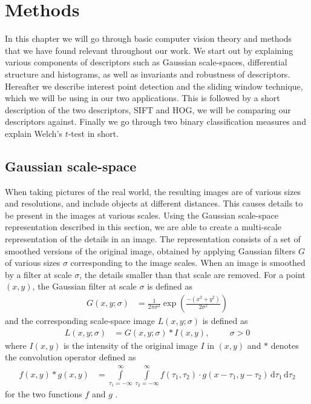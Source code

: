 \documentclass[thesis.tex]{subfiles}
\begin{document}
\chapter{Methods}
In this chapter we will go through basic computer vision theory and methods that we have found relevant throughout our work. We start out by explaining various components of descriptors such as Gaussian scale-spaces, differential structure and histograms, as well as invariants and robustness of descriptors. Hereafter we describe interest point detection and the sliding window technique, which we will be using in our two applications. This is followed by a short description of the two descriptors, SIFT and HOG, we will be comparing our descriptors against. Finally we go through two binary classification measures and explain Welch's $t$-test in short.

\section{Gaussian scale-space}
\label{sec:GaussianScaleSpace}
%
When taking pictures of the real world, the resulting images are of various sizes and resolutions, and include objects at different distances. This causes details to be present in the images at various scales. Using the Gaussian scale-space representation \cite{griffin1997scale,ginneken2000applications} described in this section, we are able to create a multi-scale representation of the details in an image. The representation consists of a set of smoothed versions of the original image, obtained by applying Gaussian filters $G$ of various sizes $\sigma$ corresponding to the image scales. When an image is smoothed by a filter at scale $\sigma$, the details smaller than that scale are removed. For a point $(x,y)$, the Gaussian filter at scale $\sigma$ is defined as
%
\begin{align}
	G(x,y;\sigma) &= \frac{1}{2\pi \sigma^2} \exp \left(\frac{-(x^2+y^2)}{2\sigma^2} \right)
\end{align}
%
and the corresponding scale-space image $L(x,y;\sigma)$ is defined as
%
\begin{align}
	L(x,y;\sigma) &= G(x,y;\sigma) \ast I(x,y),\hspace{1cm}\sigma > 0
\end{align}
%
where $I(x,y)$ is the intensity of the original image $I$ in $(x,y)$ and $\ast$ denotes the convolution operator defined as
\begin{align*}
	f(x,y) \ast g(x,y) &= \int\limits_{\tau_1 = -\infty}^\infty \int\limits_{\tau_2 = -\infty}^\infty f(\tau_1,\tau_2) \cdot g(x-\tau_1,y-\tau_2)\,\text{d}\tau_1\,\text{d}\tau_2
\end{align*}
for the two functions $f$ and $g$ \cite[p.~345]{gonzalez:2008:digital}.
\end{document}
